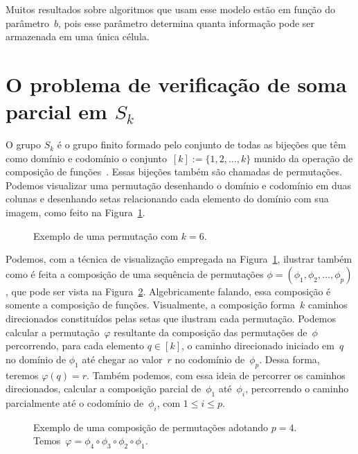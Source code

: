 Muitos resultados sobre algoritmos que usam esse modelo estão em função do parâmetro~$b$, pois esse parâmetro determina quanta informação pode ser armazenada em uma única célula. 

\section{O problema de verificação de soma parcial em $S_k$}

O grupo $S_k$ é o grupo finito formado pelo conjunto de todas as bijeções que têm como domínio e codomínio o conjunto~${[k]:=\{1,2,\ldots,k\}}$ munido da operação de composição de funções~\cite{agozine2010}. Essas bijeções também são chamadas de permutações. Podemos visualizar uma permutação desenhando o domínio e codomínio em duas colunas e desenhando setas relacionando cada elemento do domínio com sua imagem, como feito na Figura~\ref{fig:LIM-exemplo-uma-perm}.

\begin{figure}[htb]
\centering

\caption{Exemplo de uma permutação com $k=6$.}
\label{fig:LIM-exemplo-uma-perm}
\end{figure}

Podemos, com a técnica de visualização empregada na Figura~\ref{fig:LIM-exemplo-uma-perm}, ilustrar também como é feita a composição de uma sequência de permutações ${\phi=(\phi_1, \phi_2, \ldots, \phi_p)}$, que pode ser vista na Figura~\ref{fig:LIM-exemplo-comp}. Algebricamente falando, essa composição é somente a composição de funções. Visualmente, a composição forma~$k$ caminhos direcionados constituídos pelas setas que ilustram cada permutação. Podemos calcular a permutação~$\varphi$ resultante da composição das permutações de~$\phi$ percorrendo, para cada elemento $q\in [k]$, o caminho direcionado iniciado em~$q$ no domínio de $\phi_1$ até chegar ao valor~$r$ no codomínio de~$\phi_p$. Dessa forma, teremos $\varphi(q)=r$. Também podemos, com essa ideia de percorrer os caminhos direcionados, calcular a composição parcial de~$\phi_1$ até~$\phi_i$, percorrendo o caminho parcialmente até o codomínio de~$\phi_i$, com $1\leqslant i \leqslant p$.

\begin{figure}[htb]
\centering

\caption{Exemplo de uma composição de permutações adotando $p=4$. Temos~$\varphi = \phi_4\circ \phi_3\circ \phi_2\circ \phi_1$.}
\label{fig:LIM-exemplo-comp}
\end{figure}

